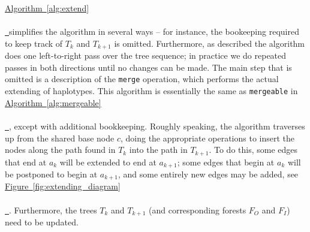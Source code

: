 \documentclass[10pt,twoside,lineno]{gsajnl}
\newcommand{\algorithmref}[2][]{%
	\hyperref[{#2}]{%
		Algorithm~\ref*{#2}%
		\ifx\\#1\\%
		\else
		\,#1%
		\fi
	}%
}
\newcommand*{\figref}[2][]{%
	\hyperref[{#2}]{%
		Figure~\ref*{#2}%
		\ifx\\#1\\%
		\else
		\,#1%
		\fi
	}%
}
\begin{document}
\algorithmref{alg:extend} simplifies the algorithm in several ways --
for instance, the bookeeping required to keep track of $T_k$ and $T_{k+1}$ is omitted.
Furthermore, as described the algorithm does one left-to-right pass over the tree sequence;
in practice we do repeated passes in both directions until no changes can be made.
The main step that is omitted is a description of the \texttt{merge} operation,
which performs the actual extending of haplotypes.
This algorithm is essentially the same as \texttt{mergeable} in \algorithmref{alg:mergeable},
except with additional bookkeeping.
Roughly speaking, the algorithm
traverses up from the shared base node $c$,
doing the appropriate operations to insert the nodes along the path found in $T_k$
into the path in $T_{k+1}$.
To do this, some edges that end at $a_k$ will be extended to end at $a_{k+1}$;
some edges that begin at $a_k$ will be postponed to begin at $a_{k+1}$,
and some entirely new edges may be added, see \figref{fig:extending_diagram}.
Furthermore, the trees $T_k$ and $T_{k+1}$ (and corresponding forests $F_O$ and $F_I$)
need to be updated.
\end{document}
